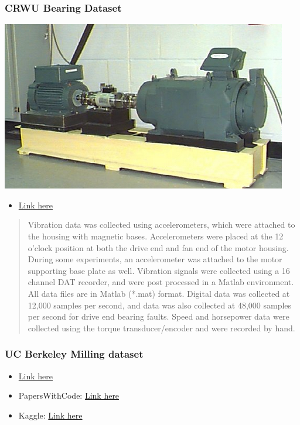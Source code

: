 \documentclass[
  letterpaper,
  DIV=11,
  numbers=noendperiod]{scrartcl}
\providecommand{\tightlist}{%
  \setlength{\itemsep}{0pt}\setlength{\parskip}{0pt}}\usepackage{longtable,booktabs,array}
\begin{document}
\hypertarget{crwu-bearing-dataset}{%
\subsubsection{CRWU Bearing Dataset}\label{crwu-bearing-dataset}}

\includegraphics{img/2023-01-08-19-36-39.png}

\begin{itemize}
\tightlist
\item
  \href{https://engineering.case.edu/bearingdatacenter/download-data-file}{Link
  here}
\end{itemize}

\begin{quote}
Vibration data was collected using accelerometers, which were attached
to the housing with magnetic bases. Accelerometers were placed at the 12
o'clock position at both the drive end and fan end of the motor housing.
During some experiments, an accelerometer was attached to the motor
supporting base plate as well. Vibration signals were collected using a
16 channel DAT recorder, and were post processed in a Matlab
environment. All data files are in Matlab (*.mat) format. Digital data
was collected at 12,000 samples per second, and data was also collected
at 48,000 samples per second for drive end bearing faults. Speed and
horsepower data were collected using the torque transducer/encoder and
were recorded by hand.
\end{quote}

\hypertarget{uc-berkeley-milling-dataset}{%
\subsubsection{UC Berkeley Milling
dataset}\label{uc-berkeley-milling-dataset}}

\begin{itemize}
\tightlist
\item
  \href{https://www.nasa.gov/content/prognostics-center-of-excellence-data-set-repository}{Link
  here}
\item
  PapersWithCode:
  \href{https://paperswithcode.com/dataset/milling-data-set}{Link here}
\item
  Kaggle:
  \href{https://www.kaggle.com/datasets/vinayak123tyagi/milling-data-set-prognostic-data}{Link
  here}
\end{itemize}
\end{document}
